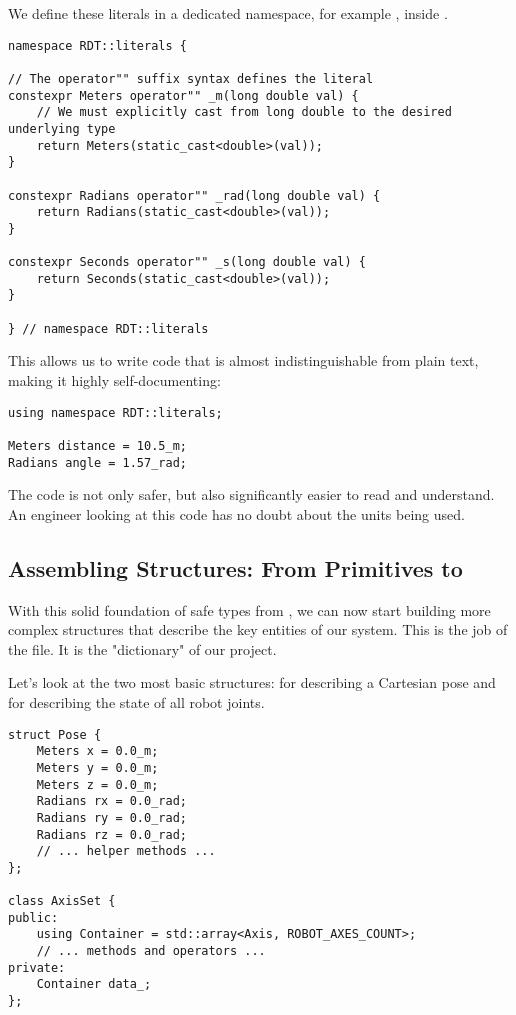 We define these literals in a dedicated namespace, for example , inside .

\begin{verbatim}
namespace RDT::literals {

// The operator"" suffix syntax defines the literal
constexpr Meters operator"" _m(long double val) {
    // We must explicitly cast from long double to the desired underlying type
    return Meters(static_cast<double>(val));
}

constexpr Radians operator"" _rad(long double val) {
    return Radians(static_cast<double>(val));
}

constexpr Seconds operator"" _s(long double val) {
    return Seconds(static_cast<double>(val));
}

} // namespace RDT::literals
\end{verbatim}
\label{lst:unit-literals}

This allows us to write code that is almost indistinguishable from plain text, making it highly self-documenting:
\begin{verbatim}
using namespace RDT::literals;

Meters distance = 10.5_m;
Radians angle = 1.57_rad;
\end{verbatim}
\label{lst:unit-literals-usage}

The code is not only safer, but also significantly easier to read and understand. An engineer looking at this code has no doubt about the units being used.

\subsection{Assembling Structures: From Primitives to }
\label{subsec:data_types_assembly}

With this solid foundation of safe types from , we can now start building more complex structures that describe the key entities of our system. This is the job of the  file. It is the "dictionary" of our project.

Let's look at the two most basic structures:  for describing a Cartesian pose and  for describing the state of all robot joints.

\begin{verbatim}
struct Pose {
    Meters x = 0.0_m;
    Meters y = 0.0_m;
    Meters z = 0.0_m;
    Radians rx = 0.0_rad;
    Radians ry = 0.0_rad;
    Radians rz = 0.0_rad;
    // ... helper methods ...
};

class AxisSet {
public:
    using Container = std::array<Axis, ROBOT_AXES_COUNT>;
    // ... methods and operators ...
private:
    Container data_;
};
\end{verbatim}
\label{lst:core-data-types}

